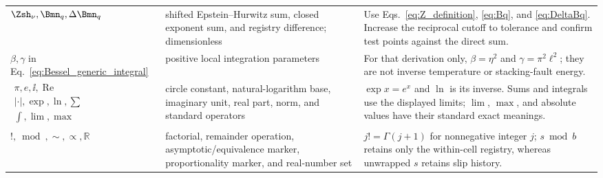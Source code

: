 \begin{longtable}{>{\raggedright\arraybackslash}p{}
                  >{\raggedright\arraybackslash}p{}
                  >{\raggedright\arraybackslash}p{}}
$\Zsh_\nu,\Bmn_q,\Delta\Bmn_q$ & shifted Epstein--Hurwitz sum, closed exponent sum, and registry
difference; dimensionless & Use Eqs.~\eqref{eq:Z_definition}, \eqref{eq:Bq}, and
\eqref{eq:DeltaBq}. Increase the reciprocal cutoff to tolerance and confirm test points against
the direct sum.\\
$\beta,\gamma$ in Eq.~\eqref{eq:Bessel_generic_integral} & positive local integration parameters &
For that derivation only, $\beta=\eta^2$ and $\gamma=\pi^2\ell^2$; they are not inverse temperature
or stacking-fault energy.\\
$\begin{gathered}\pi,e,\ii,\operatorname{Re}\\|\cdot|,\exp,\ln,\sum\\
\int,\lim,\max\end{gathered}$ & circle constant, natural-logarithm base, imaginary
unit, real part, norm, and standard operators & $\exp x=e^x$ and $\ln$ is its inverse. Sums and
integrals use the displayed limits; $\lim$, $\max$, and absolute values have their standard exact
meanings.\\
$!,\bmod,\sim,\propto,\mathbb R$ & factorial, remainder operation, asymptotic/equivalence marker,
proportionality marker, and real-number set & $j!=\Gamma(j+1)$ for nonnegative integer $j$;
$s\bmod b$ retains only the within-cell registry, whereas unwrapped $s$ retains slip history.\\
\end{longtable}

